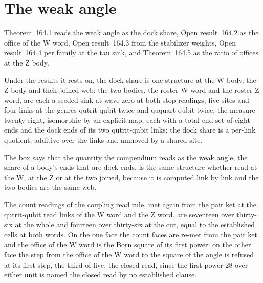 \section{The weak angle}\label{mod:VI-6-weak-angle}
\label{narr:open:6-6}Theorem~164.1 reads the weak angle as the dock share, Open result~164.2 as the office of the W word, Open result~164.3 from the stabilizer weights, Open result~164.4 per family at the tau sink, and Theorem~164.5 as the ratio of offices at the Z body.
\begin{chconditional}\label{box:VI-6-weak-angle:1}
Under the results it rests on, the dock share is one structure at the W body, the Z body and their joined web: the two bodies, the roster W word and the roster Z word, are each a seeded sink at wave zero at both stop readings, five sites and four links at the genres qutrit-qubit twice and ququart-qubit twice, the measure twenty-eight, isomorphic by an explicit map, each with a total end set of eight ends and the dock ends of its two qutrit-qubit links; the dock share is a per-link quotient, additive over the links and unmoved by a shared site.
\end{chconditional}
The box says that the quantity the compendium reads as the weak angle, the share of a body's ends that are dock ends, is the same structure whether read at the W, at the Z or at the two joined, because it is computed link by link and the two bodies are the same web.
\begin{chwall}\label{box:VI-6-weak-angle:2}
The count readings of the coupling read rule, met again from the pair ket at the qutrit-qubit read links of the W word and the Z word, are seventeen over thirty-six at the whole and fourteen over thirty-six at the cut, equal to the established cells at both words. On the one face the count faces are re-met from the pair ket and the office of the W word is the Born square of its first power; on the other face the step from the office of the W word to the square of the angle is refused at its first step, the third of five, the closed read, since the first power 28 over either unit is named the closed read by no established clause.
\end{chwall}
